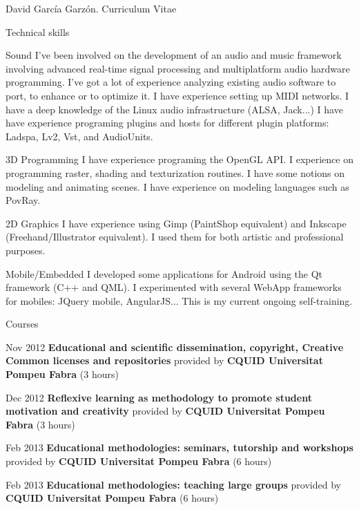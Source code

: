 \documentclass{article}
\begin{document}
\begin{cv}{David García Garzón. Curriculum Vitae}
\begin{cvlist}{Technical skills}
\item[Sound]
	I've been involved on the development of an audio and music framework involving advanced real-time signal processing and multiplatform audio hardware programming. I've got a lot of experience analyzing existing audio software to port, to enhance or to optimize it. I have experience setting up MIDI networks. I have a deep knowledge of the Linux audio infrastructure (ALSA, Jack...) I have have experience programing plugins and hosts for different plugin platforms: Ladspa, Lv2, Vst, and AudioUnits. 

\item[3D Programming]
	I have experience programing the OpenGL API. I experience on programming raster, shading and texturization routines. I have some notions on modeling and animating scenes. I have experience on modeling languages such as PovRay. 

\item[2D Graphics]
	I have experience using Gimp (PaintShop equivalent) and Inkscape (Freehand/Illustrator equivalent). I used them for both artistic and professional purposes. 

\item[Mobile/Embedded]
	I developed some applications for Android using the Qt framework (C++ and QML). I experimented with several WebApp frameworks for mobiles: JQuery mobile, AngularJS... This is my current ongoing self-training.

\end{cvlist}

\begin{cvlist}{Courses}

\item[Nov 2012]
	{\bf Educational and scientific dissemination, copyright, Creative Common licenses and repositories } provided by {\bf CQUID Universitat Pompeu Fabra} (3 hours)

\item[Dec 2012]
	{\bf Reflexive learning as methodology to promote student motivation and creativity } provided by {\bf CQUID Universitat Pompeu Fabra} (3 hours)

\item[Feb 2013]
	{\bf Educational methodologies: seminars, tutorship and workshops } provided by {\bf CQUID Universitat Pompeu Fabra} (6 hours)

\item[Feb 2013]
	{\bf Educational methodologies: teaching large groups } provided by {\bf CQUID Universitat Pompeu Fabra} (6 hours)


\end{cvlist}
\end{cv}
\end{document}
